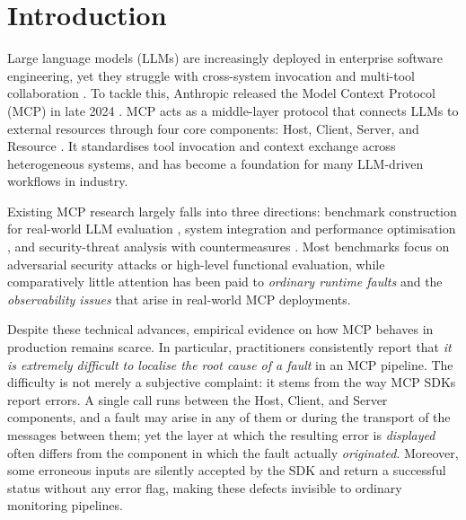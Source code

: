 
\section{Introduction}\label{sec:intro}

\noindent Large language models (LLMs) are increasingly deployed in enterprise software
engineering, yet they struggle with cross-system invocation and multi-tool collaboration
\cite{hou2025model}\cite{yang2025survey}. To tackle this, Anthropic released the Model
Context Protocol (MCP) in late 2024 \cite{anthropic_mcp_2024}. MCP acts as a middle-layer
protocol that connects LLMs to external resources through four core components: Host,
Client, Server, and Resource \cite{yang2025survey}. It standardises tool invocation and
context exchange across heterogeneous systems, and has become a foundation for many
LLM-driven workflows in industry.

Existing MCP research largely falls into three directions: benchmark construction for
real-world LLM evaluation \cite{liu2025mcpeval}\cite{yang2025mcpsecbench}, system
integration and performance optimisation \cite{xu2025towards}\cite{li2025energyplus}, and
security-threat analysis with countermeasures \cite{hasan2025model}\cite{mcpSecurity2025}.
Most benchmarks focus on adversarial security attacks or high-level functional evaluation,
while comparatively little attention has been paid to \emph{ordinary runtime faults} and
the \emph{observability issues} that arise in real-world MCP deployments.

Despite these technical advances, empirical evidence on how MCP behaves in production
remains scarce. In particular, practitioners consistently report that \emph{it is
extremely difficult to localise the root cause of a fault} in an MCP pipeline. The
difficulty is not merely a subjective complaint: it stems from the way MCP SDKs report
errors. A single call runs between the Host, Client, and Server components, and a fault may
arise in any of them or during the transport of the messages between them; yet the layer at
which the resulting error is \emph{displayed} often differs from the component in which the
fault actually \emph{originated}. Moreover, some erroneous inputs are silently accepted by
the SDK and return a successful status without any error flag, making these defects
invisible to ordinary monitoring pipelines.

